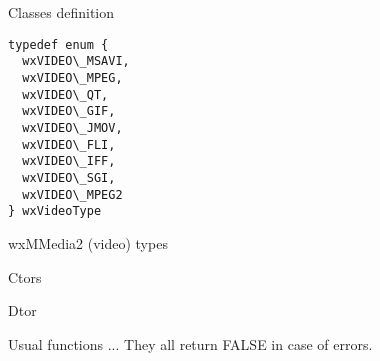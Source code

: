 %
%

\section{}\label{wxvideobasedriver}

Classes definition




{\small \begin{verbatim}
typedef enum {
  wxVIDEO\_MSAVI,
  wxVIDEO\_MPEG,
  wxVIDEO\_QT,
  wxVIDEO\_GIF,
  wxVIDEO\_JMOV,
  wxVIDEO\_FLI,
  wxVIDEO\_IFF,
  wxVIDEO\_SGI,
  wxVIDEO\_MPEG2
} wxVideoType
\end{verbatim}}

wxMMedia2 (video) types


\label{wxvideobasedriverwxvideobasedriver}


Ctors


\label{wxvideobasedriverwxvideobasedriver}



\label{wxvideobasedriverwxvideobasedriver}



\label{wxvideobasedriverdtor}


Dtor


\label{wxvideobasedriverplay}


Usual functions ... They all return FALSE in case of errors.


\label{wxvideobasedriverstop}




